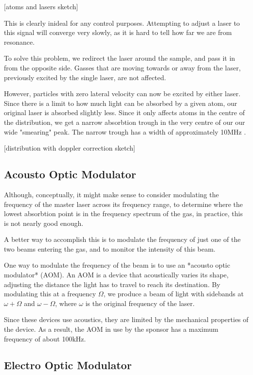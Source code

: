[atoms and lasers sketch]

This is clearly inideal for any control purposes.  Attempting to adjust a laser to this signal will converge very slowly, as it is hard to tell how far we are from resonance.

To solve this problem, we redirect the laser around the sample, and pass it in from the opposite side.  Gasses that are moving towards or away from the laser, previously excited by the single laser, are not affected.

However, particles with zero lateral velocity can now be excited by either laser.  Since there is a limit to how much light can be absorbed by a given atom, our original laser is absorbed slightly less.  Since it only affects atoms in the centre of the distribution, we get a narrow absorbtion trough in the very centre of our our wide "smearing" peak.  The narrow trough has a width of approximately 10MHz \cite{madison14}.

[distribution with doppler correction sketch]

\subsection{Acousto Optic Modulator}

Although, conceptually, it might make sense to consider modulating the frequency of the master laser across its frequency range, to determine where the lowest absorbtion point is in the frequency spectrum of the gas, in practice, this is not nearly good enough.

A better way to accomplish this is to modulate the frequency of just one of the two beams entering the gas, and to monitor the intensity of this beam.

One way to modulate the frequency of the beam is to use an *acousto optic modulator* (AOM).  An AOM is a device that acoustically varies its shape, adjusting the distance the light has to travel to reach its destination.  By modulating this at a frequency $\Omega$, we produce a beam of light with sidebands at $\omega + \Omega$ and $\omega - \Omega$, where $\omega$ is the original frequency of the laser.

Since these devices use acoustics, they are limited by the mechanical properties of the device.  As a result, the AOM in use by the sponsor has a maximum frequency of about 100kHz.

\subsection{Electro Optic Modulator}

